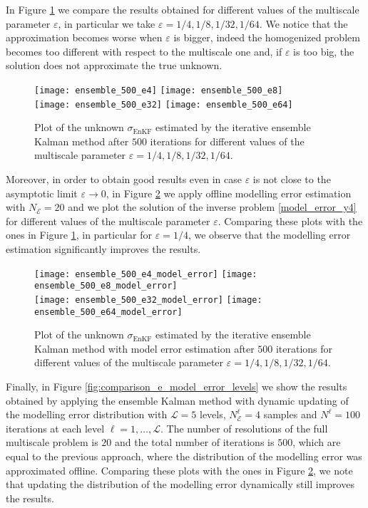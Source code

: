 In Figure \ref{fig:comparison_e} we compare the results obtained for different values of the multiscale parameter $\varepsilon$, in particular we take $\varepsilon = 1/4, 1/8, 1/32, 1/64$. We notice that the approximation becomes worse when $\varepsilon$ is bigger, indeed the homogenized problem becomes too different with respect to the multiscale one and, if $\varepsilon$ is too big, the solution does not approximate the true unknown.

\begin{figure}[t]
\centering
\texttt{[image: ensemble\_500\_e4]}
\texttt{[image: ensemble\_500\_e8]}
\\
\texttt{[image: ensemble\_500\_e32]}
\texttt{[image: ensemble\_500\_e64]}
\caption{Plot of the unknown $\sigma_{\mathrm{EnKF}}$ estimated by the iterative ensemble Kalman method after $500$ iterations for different values of the multiscale parameter $\varepsilon = 1/4, 1/8, 1/32, 1/64$.}
\label{fig:comparison_e}
\end{figure}

Moreover, in order to obtain good results even in case $\varepsilon$ is not close to the asymptotic limit $\varepsilon \to 0$, in Figure \ref{fig:comparison_e_model_error} we apply offline modelling error estimation with $N_{\mathcal{E}} = 20$ and we plot the solution of the inverse problem \eqref{model_error_y4} for different values of the multiscale parameter $\varepsilon$. Comparing these plots with the ones in Figure \ref{fig:comparison_e}, in particular for $\varepsilon = 1/4$, we observe that the modelling error estimation significantly improves the results.

\begin{figure}[t]
\centering
\texttt{[image: ensemble\_500\_e4\_model\_error]}
\texttt{[image: ensemble\_500\_e8\_model\_error]}
\\
\texttt{[image: ensemble\_500\_e32\_model\_error]}
\texttt{[image: ensemble\_500\_e64\_model\_error]}
\caption{Plot of the unknown $\sigma_{\mathrm{EnKF}}$ estimated by the iterative ensemble Kalman method with model error estimation after $500$ iterations for different values of the multiscale parameter $\varepsilon = 1/4, 1/8, 1/32, 1/64$.}
\label{fig:comparison_e_model_error}
\end{figure}

Finally, in Figure \ref{fig:comparison_e_model_error_levels} we show the results obtained by applying the ensemble Kalman method with dynamic updating of the modelling error distribution with $\mathcal{L} = 5$ levels, $N_{\mathcal{E}}^{\ell} = 4$ samples and $N^{\ell} = 100$ iterations at each level $\ell = 1, \dots, \mathcal{L}$. The number of resolutions of the full multiscale problem is $20$ and the total number of iterations is $500$, which are equal to the previous approach, where the distribution of the modelling error was approximated offline. Comparing these plots with the ones in Figure \ref{fig:comparison_e_model_error}, we note that updating the distribution of the modelling error dynamically still improves the results.

